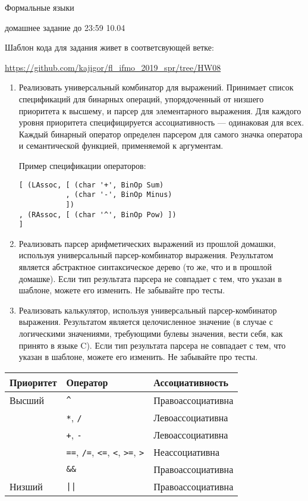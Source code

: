 \documentclass[12pt]{article}
\begin{document}
\begin{center}
\LARGE {Формальные языки}

\Large {домашнее задание до 23:59 10.04}
\end{center} 

\bigskip

Шаблон кода для задания живет в соответсвующей ветке: 

\url{https://github.com/kajigor/fl\_ifmo\_2019\_spr/tree/HW08}

\begin{enumerate}
  \item Реализовать универсальный комбинатор для выражений. Принимает список спецификаций для бинарных операций, упорядоченный от низшего приоритета к высшему, и парсер для элементарного выражения. Для каждого уровня приоритета специфицируется ассоциативность --- одинаковая для всех. Каждый бинарный оператор определен парсером для самого значка оператора и семантической функцией, применяемой к аргументам. 
  
  Пример спецификации операторов: 
  
\begin{verbatim}
[ (LAssoc, [ (char '+', BinOp Sum)
           , (char '-', BinOp Minus)      
           ])
, (RAssoc, [ (char '^', BinOp Pow) ])
]    
\end{verbatim}

  
  \item 
  Реализовать парсер арифметических выражений из прошлой домашки, используя универсальный парсер-комбинатор выражения. Результатом является абстрактное синтаксическое дерево (то же, что и в прошлой домашке). Если тип результата парсера не совпадает с тем, что указан в шаблоне, можете его изменить. Не забывайте про тесты.
    
  \item 
  Реализовать калькулятор, используя универсальный парсер-комбинатор выражения. Результатом является целочисленное значение (в случае с логическими значениями, требующими булевы значения, вести себя, как принято в языке C). Если тип результата парсера не совпадает с тем, что указан в шаблоне, можете его изменить. Не забывайте про тесты.\textbf{}
\end{enumerate}

\begin{table}[h]
\centering
\begin{tabular}{l|l|l}
Приоритет & Оператор & Ассоциативность \\ \hline
Высший & \verb!^! & Правоассоциативна \\
       & \verb!*!, \verb!/! & Левоассоциативна  \\
       & \verb!+!, \verb!-! & Левоассоциативна  \\
       & \verb!==!, \verb!/=!, \verb!<=!, \verb!<!, \verb!>=!, \verb!>! & Неассоциативна \\
       & \verb!&&! & Правоассоциативна \\
Низший & \verb!||! & Правоассоциативна 
\end{tabular}
\end{table}
\end{document}
